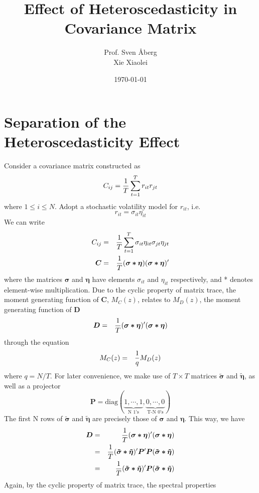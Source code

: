 \documentclass{article}
\author{
  Prof. Sven \AA berg \\
  Xie Xiaolei}
\date{\today}
\title{Effect of Heteroscedasticity in Covariance Matrix}
\begin{document}
\maketitle

\section{Separation of the Heteroscedasticity Effect}
Consider a covariance matrix constructed as
$$
C_{ij} = {1 \over T}\sum_{t=1}^T r_{it} r_{jt}
$$
where $1 \leq i \leq N$. Adopt a stochastic volatility model for
$r_{it}$, i.e.
$$
r_{it} = \sigma_{it} \eta_{it}
$$
We can write
\begin{eqnarray}
C_{ij} &=& {1 \over T}\sum_{t=1}^T \sigma_{it} \eta_{it} \sigma_{jt}
\eta_{jt} \nonumber \\
\bm{C} &=& {1 \over T} (\bm{\sigma * \eta}) (\bm{\sigma *
  \eta})' \label{eq:C}
\end{eqnarray}
where the matrices $\bm{\sigma}$ and $\bm{\eta}$ have elements
$\sigma_{it}$ and $\eta_{it}$ respectively, and * denotes element-wise
multiplication. Due to the cyclic property of matrix trace, the
moment generating function of $\bm{C}$, $M_C(z)$, relates to $M_D(z)$,
the moment generating function of $\bm D$
\begin{eqnarray*}
  \bm{D} &=& {1 \over T} (\bm{\sigma * \eta})' (\bm{\sigma * \eta})
\end{eqnarray*}
through the equation
\begin{eqnarray*}
  M_C(z) &=& {1 \over q} M_D(z)
\end{eqnarray*}
where $q = N/T$. For later convenience, we make use of $T \times T$
matrices $\bm{\tilde{\sigma}}$ and $\bm{\tilde{\eta}}$, as well as a
projector
$$
\bm{P} = \text{diag}(\underbrace{1, \cdots, 1}_{\text{N 1's}}, 
\underbrace{0, \cdots, 0}_{\text{T-N 0's}})
$$
The first N rows of $\tilde{\bm{\sigma}}$ and $\bm{\tilde{\eta}}$ are
precisely those of $\bm{\sigma}$ and $\bm{\eta}$. This way, we have
\begin{eqnarray*}
\bm D &=& {1 \over T} (\bm{\sigma * \eta})' (\bm{\sigma * \eta}) \\
&=& {1 \over T} (\bm{\tilde{\sigma} * \tilde{\eta}})' \bm P'
\bm P (\bm{\tilde{\sigma} * \tilde{\eta}}) \\
&=& {1 \over T} (\bm{\tilde{\sigma} * \tilde{\eta}})'
\bm P (\bm{\tilde{\sigma} * \tilde{\eta}}) \\
\end{eqnarray*}
Again, by the cyclic property of matrix trace, the spectral properties
\end{document}
